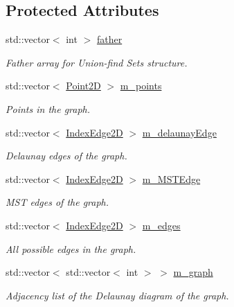 \subsection*{Protected Attributes}
\begin{DoxyCompactItemize}
\item 
std\+::vector$<$ int $>$ \hyperlink{classcmst_1_1_graph2_d_ad5d251f2f6f8b827af4404985fcec53c}{father}
\begin{DoxyCompactList}\small\item\em Father array for Union-\/find Sets structure. \end{DoxyCompactList}\item 
std\+::vector$<$ \hyperlink{classcmst_1_1_point2_d}{Point2D} $>$ \hyperlink{classcmst_1_1_graph2_d_a32456f3c630e34a56ce3109183142c10}{m\+\_\+points}
\begin{DoxyCompactList}\small\item\em Points in the graph. \end{DoxyCompactList}\item 
std\+::vector$<$ \hyperlink{classcmst_1_1_index_edge2_d}{Index\+Edge2D} $>$ \hyperlink{classcmst_1_1_graph2_d_a6fe64b2078ec3c700a8a2e2bd77e2dae}{m\+\_\+delaunay\+Edge}
\begin{DoxyCompactList}\small\item\em Delaunay edges of the graph. \end{DoxyCompactList}\item 
std\+::vector$<$ \hyperlink{classcmst_1_1_index_edge2_d}{Index\+Edge2D} $>$ \hyperlink{classcmst_1_1_graph2_d_a1cc96b5251162964ac21f46955ac8271}{m\+\_\+\+M\+S\+T\+Edge}
\begin{DoxyCompactList}\small\item\em M\+ST edges of the graph. \end{DoxyCompactList}\item 
std\+::vector$<$ \hyperlink{classcmst_1_1_index_edge2_d}{Index\+Edge2D} $>$ \hyperlink{classcmst_1_1_graph2_d_a31a6b042c1c1941ee59672b842c7d3c9}{m\+\_\+edges}
\begin{DoxyCompactList}\small\item\em All possible edges in the graph. \end{DoxyCompactList}\item 
std\+::vector$<$ std\+::vector$<$ int $>$ $>$ \hyperlink{classcmst_1_1_graph2_d_a5df9c78edb4f5c68da11b01e44061dc5}{m\+\_\+graph}
\begin{DoxyCompactList}\small\item\em Adjacency list of the Delaunay diagram of the graph. \end{DoxyCompactList}\item 

\end{DoxyCompactItemize}
